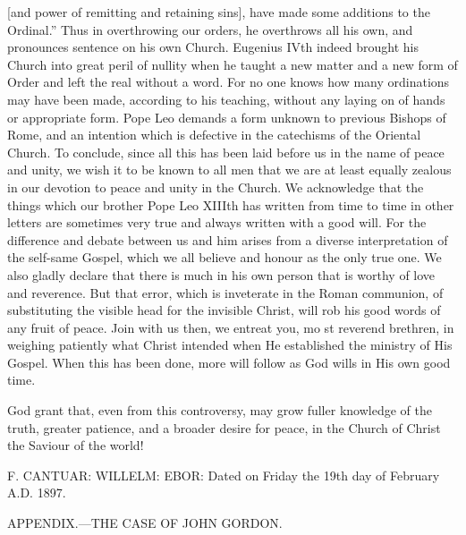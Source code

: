 [and power of remitting and retaining sins], have made some additions to the Ordinal.” Thus in overthrowing our orders, he overthrows all his own, and pronounces sentence on his own Church. Eugenius IVth indeed brought his Church into great peril of nullity when he taught a new matter and a new form of Order and left the real without a word. For no one knows how many ordinations may have been made, according to his teaching, without any laying on of hands or appropriate form. Pope Leo demands a form unknown to previous Bishops of Rome, and an intention which is defective in the catechisms of the Oriental Church. To conclude, since all this has been laid before us in the name of peace and unity, we wish it to be known to all men that we are at least equally zealous in our devotion to peace and unity in the Church. We acknowledge that the things which our brother Pope Leo XIIIth has written from time to time in other letters are sometimes very true and always written with a good will. For the difference and debate between us and him arises from a diverse interpretation of the self-same Gospel, which we all believe and honour as the only true one. We also gladly declare that there is much in his own person that is worthy of love and reverence. But that error, which is inveterate in the Roman communion, of substituting the visible head for the invisible Christ, will rob his good words of any fruit of peace. Join with us then, we entreat you, mo st reverend brethren, in weighing patiently what Christ intended when He established the ministry of His Gospel. When this has been done, more will follow as God wills in His own good time.

God grant that, even from this controversy, may grow fuller knowledge of the truth, greater patience, and a broader desire for peace, in the Church of Christ the Saviour of the world!

F. CANTUAR: WILLELM: EBOR: Dated on Friday the 19th day of February A.D. 1897.

APPENDIX.—THE CASE OF JOHN GORDON.

